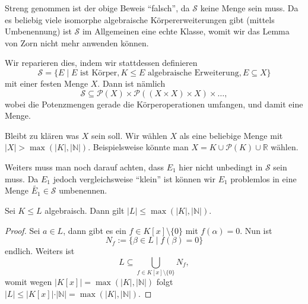 \begin{remark}
    Streng genommen ist der obige Beweis ``falsch'', da $\mathcal{S}$ keine Menge sein muss. Da es beliebig viele isomorphe algebraische Körpererweiterungen gibt (mittels Umbenennung) ist $\mathcal{S}$ im Allgemeinen eine echte Klasse, womit wir das Lemma von Zorn nicht mehr anwenden können.

    Wir reparieren dies, indem wir stattdessen definieren
    $$ \mathcal{S} = \{ E \mid E \text{ ist Körper}, K \leq E \text{ algebraische Erweiterung}, E \subseteq X \} $$
    mit einer festen Menge $X$. Dann ist nämlich
    $$ \mathcal{S} \subseteq \mathcal{P}(X) \times \mathcal{P}((X \times X) \times X) \times \hdots, $$
    wobei die Potenzmengen gerade die Körperoperationen umfangen, und damit eine Menge.

    Bleibt zu klären was $X$ sein soll. Wir wählen $X$ als eine beliebige Menge mit $\vert X \vert > \max(\vert K \vert, \vert \mathbb{N} \vert)$. Beispielsweise könnte man $X = K \cup \mathcal{P}(K) \cup \mathbb{R}$ wählen.

    Weiters muss man noch darauf achten, dass $E_1$ hier nicht unbedingt in $\mathcal{S}$ sein muss. Da $E_1$ jedoch vergleichsweise ``klein'' ist können wir $E_1$ problemlos in eine Menge $\widetilde{E_1} \in \mathcal{S}$ umbenennen.
\end{remark}

\begin{proposition}
    Sei $K \leq L$ algebraisch. Dann gilt $\vert L \vert \leq \max(\vert K \vert, \vert \mathbb{N} \vert)$.
\end{proposition}

\begin{proof}
    Sei $a \in L$, dann gibt es ein $f \in K[x] \setminus \{0\}$ mit $f(\alpha) = 0$. Nun ist
    $$ N_f := \{ \beta \in L \mid f(\beta) = 0 \} $$
    endlich. Weiters ist
    $$ L \subseteq \bigcup_{f \in K[x] \setminus \{0\}} N_f, $$
    womit wegen $\vert K[x] \vert = \max(\vert K \vert, \vert \mathbb{N} \vert)$ folgt $\vert L \vert \leq \vert K[x] \vert \cdot \vert \mathbb{N} \vert = \max(\vert K \vert, \vert \mathbb{N} \vert)$.
\end{proof}


